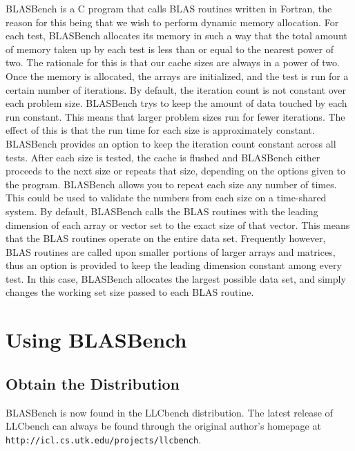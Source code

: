 \documentclass [12pt]{article}
\begin{document}
BLASBench is a C program that calls BLAS routines written in
Fortran, the reason for this being that we wish to perform dynamic
memory allocation.
For each test, BLASBench allocates its
memory in such a way that the total amount of memory taken up by each
test is less than or equal to the nearest power of two. The rationale
for this is that our cache sizes are always in a power of two. Once
the memory is allocated, the arrays are initialized, and the test is
run for a certain number of iterations. By default, the iteration
count is not constant over each problem size. BLASBench trys to keep
the amount of data touched by each run constant. This means that
larger problem sizes run for fewer iterations. The effect of this
is that the run time for each size is approximately
constant. BLASBench provides an option to keep the iteration count
constant across all tests. After each size is tested, the cache is
flushed and BLASBench either proceeds to the next size or repeats that
size, depending on the options given to the program. BLASBench allows
you to repeat each size any number of times. This could be used to
validate the numbers from each size on a time-shared
system. By default, BLASBench calls the BLAS routines with the leading
dimension of each array or vector set to the exact size of that
vector. This means that the BLAS routines operate on the entire data
set. Frequently however, BLAS routines are called upon smaller
portions of larger arrays and matrices, thus an option is provided to
keep the leading dimension constant among every test. In this case,
BLASBench allocates the largest possible data set, and simply changes
the working set size passed to each BLAS routine.

\section{Using BLASBench}

\subsection{Obtain the Distribution}

BLASBench is now found in the LLCbench distribution.
The latest release of LLCbench can always be found through the original author's homepage at \\
{\tt http://icl.cs.utk.edu/projects/llcbench}. \\
\end{document}
